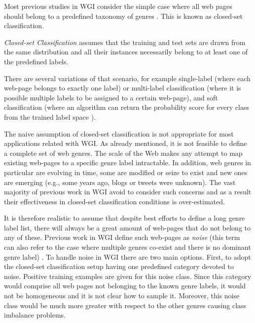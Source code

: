 \begin{itemize}
Most previous studies in WGI consider the simple case where all web pages should belong to a predefined taxonomy of genres \parencite{Lim2005,santini2007automatic,kanaris2009learning,jebari2014pureURL}. This is known as closed-set classification.

\begin{definition}{\textit{Closed-set Classification}}
assumes that the training and test sets are drawn from the same distribution and all their instances necessarily belong to at least one of the predefined labels. 
\end{definition}

There are several variations of that scenario, for example single-label (where each web-page belongs to exactly one label) or multi-label classification (where it is possible multiple labels to be assigned to a certain web-page), and soft classification (where an algorithm can return the probability score for every class from the trained label space \parencite{geng2018recent}).

The naive assumption of closed-set classification is not appropriate for most applications related with WGI. As already mentioned, it is not feasible to define a complete set of web genres. The scale of the Web makes any attempt to map existing web-pages to a specific genre label intractable. In addition, web genres in particular are evolving in time, some are modified or seize to exist and new ones are emerging (e.g., some years ago, blogs or tweets were unknown). The vast majority of previous work in WGI avoid to consider such concerns and as a result their effectiveness in closed-set classification conditions is over-estimated.

It is therefore realistic to assume that despite best efforts to define a long genre label list, there will always be a great amount of web-pages that do not belong to any of these. Previous work in WGI define such web-pages as \textit{noise} (this term can also refer to the case where multiple genres co-exist and there is no dominant genre label) \parencite{santini2011cross,levering2008using}. To handle noise in WGI there are two main options. First, to adopt the closed-set classification setup having one predefined category devoted to noise. Positive training examples are given for this noise class. Since this category would comprise all web pages not belonging to the known genre labels, it would not be homogeneous and it is not clear how to sample it. Moreover, this noise class would be much more greater with respect to the other genres causing class imbalance problems. 


\end{itemize}
